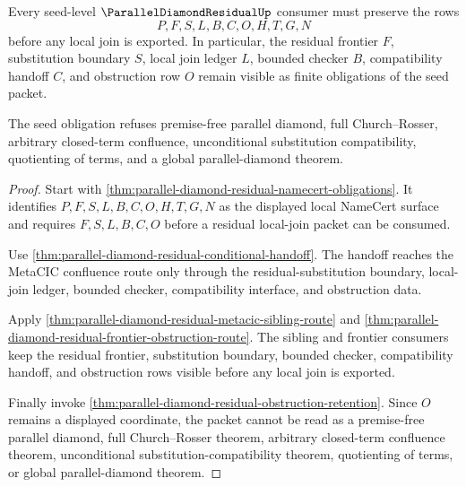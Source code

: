 \begin{theorem}
\label{thm:parallel-diamond-residual-seed-obligation}
Every seed-level $\ParallelDiamondResidualUp$ consumer must preserve the rows
$$
P,F,S,L,B,C,O,H,T,G,N
$$
before any local join is exported. In particular, the residual frontier $F$, substitution boundary $S$, local join ledger $L$, bounded checker $B$, compatibility handoff $C$, and obstruction row $O$ remain visible as finite obligations of the seed packet.

The seed obligation refuses premise-free parallel diamond, full Church--Rosser, arbitrary closed-term confluence, unconditional substitution compatibility, quotienting of terms, and a global parallel-diamond theorem.
\end{theorem}
\begin{proof}
Start with \autoref{thm:parallel-diamond-residual-namecert-obligations}. It identifies $P,F,S,L,B,C,O,H,T,G,N$ as the displayed local NameCert surface and requires $F,S,L,B,C,O$ before a residual local-join packet can be consumed.

Use \autoref{thm:parallel-diamond-residual-conditional-handoff}. The handoff reaches the MetaCIC confluence route only through the residual-substitution boundary, local-join ledger, bounded checker, compatibility interface, and obstruction data.

Apply \autoref{thm:parallel-diamond-residual-metacic-sibling-route} and \autoref{thm:parallel-diamond-residual-frontier-obstruction-route}. The sibling and frontier consumers keep the residual frontier, substitution boundary, bounded checker, compatibility handoff, and obstruction rows visible before any local join is exported.

Finally invoke \autoref{thm:parallel-diamond-residual-obstruction-retention}. Since $O$ remains a displayed coordinate, the packet cannot be read as a premise-free parallel diamond, full Church--Rosser theorem, arbitrary closed-term confluence theorem, unconditional substitution-compatibility theorem, quotienting of terms, or global parallel-diamond theorem.
\end{proof}

